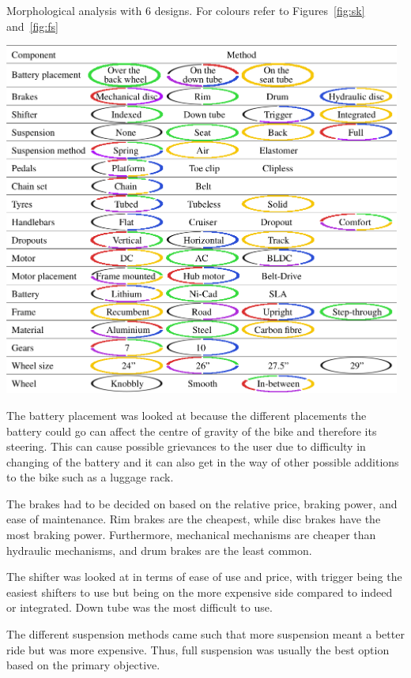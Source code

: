 \documentclass[a4paper,11pt]{article}
\begin{document}
\begin{table}[!ht]
	\centering
	\caption{Morphological analysis with 6 designs. For colours refer to Figures~\ref{fig:sk} and~\ref{fig:fs}}
	\includegraphics[width=0.98\textwidth]{morph}
\end{table}

The battery placement was looked at because the different placements the battery could go can affect the centre of gravity of the bike and therefore its steering. This can cause possible grievances to the user due to difficulty in changing of the battery and it can also get in the way of other possible additions to the bike such as a luggage rack.

The brakes had to be decided on based on the relative price, braking power, and ease of maintenance. Rim brakes are the cheapest, while disc brakes have the most braking power. Furthermore, mechanical mechanisms are cheaper than hydraulic mechanisms, and drum brakes are the least common.

The shifter was looked at in terms of ease of use and price, with trigger being the easiest shifters to use but being on the more expensive side compared to indeed or integrated. Down tube was the most difficult to use.

The different suspension methods came such that more suspension meant a better ride but was more expensive. Thus, full suspension was usually the best option based on the primary objective.
\end{document}
